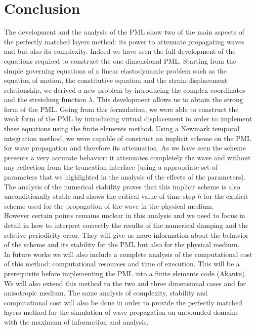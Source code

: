 \section*{Conclusion}

The development and the analysis of the PML show two of the main aspects of the perfectly matched layers method: its power to attenuate propagating waves and but also its complexity. 
Indeed we have seen the full development of the equations required to construct the one dimensional PML. Starting from the simple governing equations of a linear elastodynamic problem such as the equation of motion, the constitutive equation and the strain-displacement relationship, we derived a new problem by introducing the complex coordinates and the stretching function $\lambda$. This development allows us to obtain the strong form of the PML. Going from this formulation, we were able to construct the weak form of the PML by introducing virtual displacement in order to implement these equations using the finite elements method. Using a Newmark temporal integration method, we were capable of construct an implicit scheme on the PML for wave propagation and therefore its attenuation. As we have seen the scheme presents a very accurate behavior: it attenuates completely the wave and without any reflection from the truncation interface (using a appropriate set of parameters that we highlighted in the analysis of the effects of the parameters).  \\
The analysis of the numerical stability proves that this implicit scheme is also unconditionally stable and shows the critical value of time step $h$ for the explicit scheme used for the propagation of the wave in the physical medium. \\
However certain points remains unclear in this analysis and we need to focus in detail in how to interpret correctly the results of the numerical damping and the relative periodicity error. They will give us more information about the behavior of the scheme and its stability for the PML but also for the physical medium. \\
In future works we will also include a complete analysis of the computational cost of this method: computational resources and time of execution. This will be a prerequisite before implementing the PML into a finite elements code (Akantu). \\
We will also extend this method to the two and three dimensional cases and for anisotropic medium. The same analysis of complexity, stability and computational cost will also be done in order to provide the perfectly matched layers method for the simulation of wave propagation on unbounded domains with the maximum of information and analysis.  




